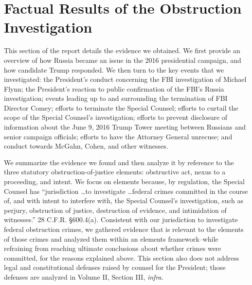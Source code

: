 \section{Factual Results of the Obstruction Investigation}
This section of the report details the evidence we obtained.
We first provide an overview of how Russia became an issue in the 2016 presidential campaign, and how candidate Trump responded.
We then turn to the key events that we investigated: the President's conduct concerning the FBI investigation of Michael Flynn;
the President's reaction to public confirmation of the FBI's Russia investigation; events leading up to and surrounding the termination of FBI Director Comey;
efforts to terminate the Special Counsel; efforts to curtail the scope of the Special Counsel's investigation;
efforts to prevent disclosure of information about the June 9, 2016 Trump Tower meeting between Russians and senior campaign officials; efforts to have the Attorney General unrecuse;
and conduct towards McGahn, Cohen, and other witnesses.

We summarize the evidence we found and then analyze it by reference to the three statutory obstruction-of-justice elements: obstructive act, nexus to a proceeding, and intent.
We focus on elements because, by regulation, the Special Counsel has ``jurisdiction \dots to investigate \dots federal crimes committed in the course of, and with intent to interfere with, the Special Counsel's investigation, such as perjury, obstruction of justice, destruction of evidence, and intimidation of witnesses.''
28 C.F.R. \S 600.4(a).
Consistent with our jurisdiction to investigate federal obstruction crimes, we gathered evidence that is relevant to the elements of those crimes and analyzed them within an elements framework--while refraining from reaching ultimate conclusions about whether crimes were committed, for the reasons explained above.
This section also does not address legal and constitutional defenses raised by counsel for the President; those defenses are analyzed in Volume II, Section III, \textit{infra}.

